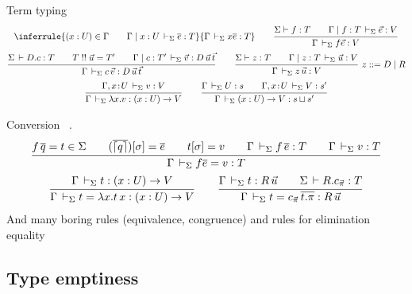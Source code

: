 \documentclass[acmlarge,fleqn]{acmart}\settopmatter{}
\begin{document}
Term typing 
\begin{gather*}
\inferrule
  {(x:U)\in \Gamma \qquad \Gamma \mid x:U \ders \overline{e}:T}
  {\Gamma \ders x \overline{e} : T}
\qquad
\ru{\Sigma \vdash f : T \qquad
    \Gamma \mid f : T \ders \vec e : V
   }{\Gamma \ders f \vec e : V}
\\
\ru{\Sigma \der D.c : T \qquad
    T \twobang \vec u = T' \qquad
    \Gamma \mid c : T' \ders \vec v : D \, \vec u \, \vec t
  }{\Gamma \ders c\,\vec v : D\,\vec u\,\vec t}
\qquad
\ru{\Sigma \vdash z : T \qquad
    \Gamma \mid z : T \ders \vec u : V
   }{\Gamma \ders z \, \vec u : V} \ z ::= D \mid R
\\
\ru{\Gamma, x \of U \ders v : V
  }{\Gamma \ders \lambda x.v : \funT x U V}
\qquad
\ru{\Gamma \ders U : s \qquad
    \Gamma, x \of U \ders V : s'
  }{\Gamma \ders \piT x U V : s \sqcup s'}
\end{gather*}


Conversion
\ .
\begin{gather*}
%
\ru{f\,\overline q = t \in \Sigma \qquad
    (\overline{\embp q})[\sigma] = \overline e \qquad
    t[\sigma] = v \qquad
    \Gamma \ders f\,\overline e : T \qquad
    \Gamma \ders v : T
  }{\Gamma \ders f \overline e = v : T}
\\
\ru{\Gamma \ders t : \funT x U V
  }{\Gamma \ders t = \lambda x. t\, x : \funT x U V}
\qquad
\ru{\Gamma \ders t : R\, \vec u \qquad
    \Sigma \der R.\cpi : T
  }{\Gamma \ders t = \cpi\,\overline{t .\pi} : R\,\vec u}
\\
\end{gather*}
And many boring rules (equivalence, congruence)
and rules for elimination equality

\newpage

\subsection{Type emptiness}
\end{document}
